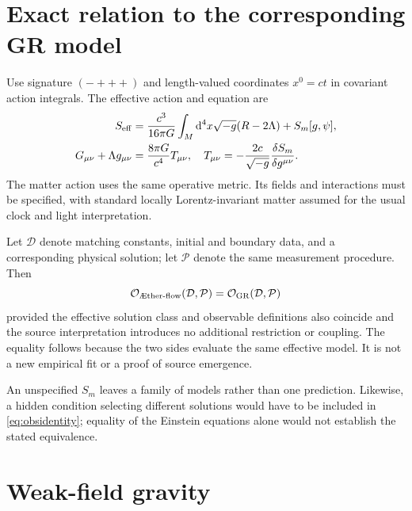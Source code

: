 \documentclass[11pt]{article}
\begin{document}
\section{Exact relation to the corresponding GR model}
Use signature $(-+++)$ and length-valued coordinates $x^0=ct$ in covariant action integrals. The effective action and equation are
\begin{align}
S_{\rm eff}&=\frac{c^3}{16\pi G}\int_M\mathrm d^4x\sqrt{-g}(R-2\Lambda)+S_m[g,\psi],
\label{eq:SA}\\
G_{\mu\nu}+\Lambda g_{\mu\nu}&=\frac{8\pi G}{c^4}T_{\mu\nu},
\quad T_{\mu\nu}=-\frac{2c}{\sqrt{-g}}\frac{\delta S_m}{\delta g^{\mu\nu}}.
\label{eq:einstein}
\end{align}
The matter action uses the same operative metric. Its fields and interactions must be specified, with standard locally Lorentz-invariant matter assumed for the usual clock and light interpretation.

Let $\mathcal D$ denote matching constants, initial and boundary data, and a corresponding physical solution; let $\mathcal P$ denote the same measurement procedure. Then
\begin{equation}
\mathcal O_{\text{\Aflow}}(\mathcal D,\mathcal P)
=\mathcal O_{\rm GR}(\mathcal D,\mathcal P)
\label{eq:obsidentity}
\end{equation}
provided the effective solution class and observable definitions also coincide and the source interpretation introduces no additional restriction or coupling. The equality follows because the two sides evaluate the same effective model. It is not a new empirical fit or a proof of source emergence.

An unspecified $S_m$ leaves a family of models rather than one prediction. Likewise, a hidden condition selecting different solutions would have to be included in \eqref{eq:obsidentity}; equality of the Einstein equations alone would not establish the stated equivalence.

\section{Weak-field gravity}
\end{document}
